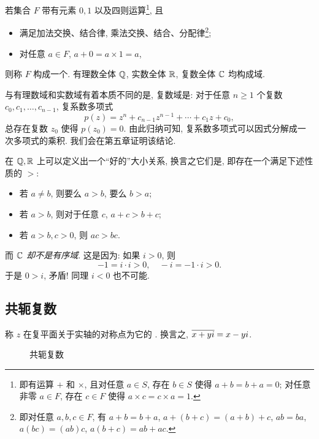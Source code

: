 若集合 $F$ 带有元素 $0,1$ 以及四则运算\footnote{%
  即有运算 $+$ 和 $\times$, 且对任意 $a\in S$, 存在 $b\in S$ 使得 $a+b=b+a=0$; 对任意非零 $a\in F$, 存在 $c\in F$ 使得 $a\times c=c\times a=1$.%
}, 且
\begin{itemize}
  \item 满足加法交换、结合律, 乘法交换、结合、分配律\footnote{即对任意 $a,b,c\in F$, 有 $a+b=b+a$, $a+(b+c)=(a+b)+c$, $ab=ba$, $a(bc)=(ab)c$, $a(b+c)=ab+ac$.};
  \item 对任意 $a\in F$, $a+0=a\times 1=a$,
\end{itemize}
则称 $F$ 构成一个.
有理数全体 ${\mathbb{Q}}$, 实数全体 ${\mathbb{R}}$, 复数全体 ${\mathbb{C}}$ 均构成域.

与有理数域和实数域有着本质不同的是, 复数域是:
对于任意 $n\ge 1$ 个复数 $c_0,c_1,\dots,c_{n-1}$, 复系数多项式
  \[p(z)=z^n+c_{n-1}z^{n-1}+\cdots+c_1z+c_0,\]
总存在复数 $z_0$ 使得 $p(z_0)=0$.
由此归纳可知, 复系数多项式可以因式分解成一次多项式的乘积.
我们会在第五章证明该结论.

在 ${\mathbb{Q}},{\mathbb{R}}$ 上可以定义出一个``好的''大小关系, 换言之它们是, 即存在一个满足下述性质的 $>$:
\begin{itemize}
  \item 若 $a\neq b$, 则要么 $a>b$, 要么 $b>a$;
  \item 若 $a>b$, 则对于任意 $c$, $a+c>b+c$;
  \item 若 $a>b,c>0$, 则 $ac>bc$.
\end{itemize}
而 \emph{${\mathbb{C}}$ 却不是有序域}.
这是因为: 如果 $i>0$, 则
  \[-1=i\cdot i>0,\quad -i=-1\cdot i>0.\]
于是 $0>i$, 矛盾! 同理 $i<0$ 也不可能.


\subsection{共轭复数}

\begin{definition}
  称 $z$ 在复平面关于实轴的对称点为它的 .
换言之, $\overline{x+yi}=x-yi$.
\end{definition}


\begin{figure}[!h]
  \centering
  \caption{共轭复数}
\end{figure}

